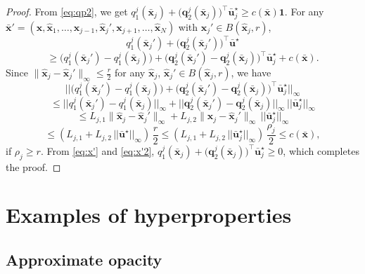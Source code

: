 \documentclass[letterpaper, 10 pt, conference]{ieeeconf}  %
\begin{document}
\begin{proof}
From \eqref{eq:qp2}, we get $q_1^j(\bar{\mathbf{x}}_j) + \big( \mathbf{q}_2^j(\bar{\mathbf{x}}_j) \big)^\top \bar{\mathbf{u}}_j^\star \ge c(\bar{\mathbf{x}}) \mathbf{1}$. For any $\bar{\mathbf{x}}' = (\mathbf{x}, \hat{\mathbf{x}}_1, \dots, \mathbf{x}_{j-1}, \hat{\mathbf{x}}_j', \mathbf{x}_{j+1}, \dots, \hat{\mathbf{x}}_N)$ with $\hat{\mathbf{x}}_j' \in B(\hat{\mathbf{x}}_j,r)$,
\[
    q_1^j(\bar{\mathbf{x}}_j') + \big( \mathbf{q}_2^j(\bar{\mathbf{x}}_j') \big)^\top \bar{\mathbf{u}}^\star
\]
\begin{equation} \label{eq:x'}
    \ge \big( q_1^j(\bar{\mathbf{x}}_j') - q_1^j(\bar{\mathbf{x}}_j) \big) + \big( \mathbf{q}_2^j(\bar{\mathbf{x}}_j') - \mathbf{q}_2^j(\bar{\mathbf{x}}_j) \big)^\top \bar{\mathbf{u}}_j^\star +  c(\bar{\mathbf{x}}).
\end{equation}
Since $\|\hat{\mathbf{x}}_j - \hat{\mathbf{x}}_j'\|_\infty \le \tfrac{r}{2}$ for any $\hat{\mathbf{x}}_j$, $\hat{\mathbf{x}}_j' \in B(\hat{\mathbf{x}}_j, r)$, we have
\[
    || \big( q_1^j(\bar{\mathbf{x}}_j') - q_1^j(\bar{\mathbf{x}}_j) \big) + \big( \mathbf{q}_2^j(\bar{\mathbf{x}}_j') - \mathbf{q}_2^j(\bar{\mathbf{x}}_j) \big)^\top \bar{\mathbf{u}}_j^\star ||_\infty
\] \[
    \leq || q_1^j(\bar{\mathbf{x}}_j') - q_1^j(\bar{\mathbf{x}}_j) ||_\infty + || \mathbf{q}_2^j(\bar{\mathbf{x}}_j') - \mathbf{q}_2^j(\bar{\mathbf{x}}_j) ||_\infty \,||\bar{\mathbf{u}}_j^\star ||_\infty
\] \[
    \leq L_{j, 1} \|\hat{\mathbf{x}}_j - \hat{\mathbf{x}}_j'\|_\infty + L_{j, 2} \|\hat{\mathbf{x}}_j - \hat{\mathbf{x}}_j'\|_\infty  \,||\bar{\mathbf{u}}_j^\star ||_\infty
\] 
\begin{equation} \label{eq:x'2}
    \leq (L_{j, 1} + L_{j, 2} \,||\bar{\mathbf{u}}^\star ||_\infty) \, \frac{r}{2} \leq (L_{j, 1} + L_{j, 2} \,||\bar{\mathbf{u}}_j^\star ||_\infty) \, \frac{\rho_j}{2} \leq c(\bar{\mathbf{x}}),
\end{equation}
if $\rho_j \ge r$. From \eqref{eq:x'} and \eqref{eq:x'2}, $q_1^j(\bar{\mathbf{x}}_j) + \big( \mathbf{q}_2^j(\bar{\mathbf{x}}_j) \big)^\top \bar{\mathbf{u}}_j^\star \ge 0$, which completes the proof.
\end{proof}

\section{Examples of hyperproperties}

\subsection{Approximate opacity}
\end{document}
